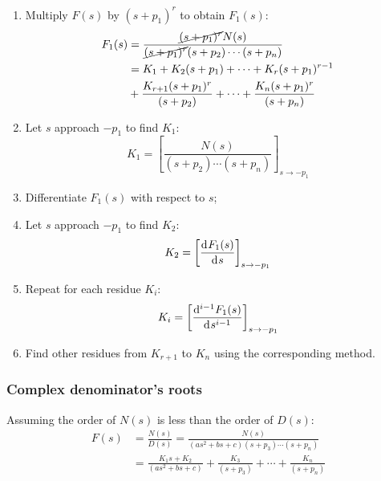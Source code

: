 \documentclass[10pt, twocolumn]{article}
\begin{document}
\begin{enumerate}
  \item Multiply \(F(s)\) by \((s + p_1)^r\) to obtain \(F_1(s)\):
        \begin{align*}
          F_1(s) & = \frac{\cancel{(s + p_1)^r}N(s)}{\cancel{(s + p_1)^r} (s + p_2) \cdots (s + p_n)}   \\
                 & = K_1 + K_2(s + p_1) + \cdots + K_r(s + p_1)^{r - 1}                                 \\
                 & + \frac{K_{r + 1}(s + p_1)^r}{(s + p_2)} + \cdots + \frac{K_n(s + p_1)^r}{(s + p_n)}
        \end{align*}
  \item Let \(s\) approach \(- p_1\) to find \(K_1\):
        \[
          K_1 = \left[ \frac{N(s)}{(s + p_2) \cdots (s + p_n)} \right]_{s \to -p_1}
        \]
  \item Differentiate \(F_1(s)\) with respect to \(s\);
  \item Let \(s\) approach \(- p_1\) to find \(K_2\):
        \[
          K_2 = \left[ \frac{\mathrm{d}^{} F_1(s)}{\mathrm{d}^{} s} \right]_{s \to -p_1}
        \]
  \item Repeat for each residue \(K_i\):
        \[
          K_i = \left[ \frac{\mathrm{d}^{i - 1} F_1(s)}{\mathrm{d}^{} s^{i - 1}} \right]_{s \to -p_1}
        \]
  \item Find other residues from \(K_{r + 1}\) to \(K_n\) using the corresponding method.
\end{enumerate}


\subsubsection{Complex denominator's roots}
Assuming the order of \(N(s)\) is less than the order of \(D(s)\):
\begin{align*}
  F(s) & = \frac{N(s)}{D(s)} = \frac{N(s)}{(as^2 + bs + c) (s + p_3) \cdots (s + p_n)}                 \\
       & = \frac{K_1s + K_2}{(as^2 + bs + c)} + \frac{K_3}{(s + p_3)} + \cdots + \frac{K_n}{(s + p_n)}
\end{align*}
\end{document}
